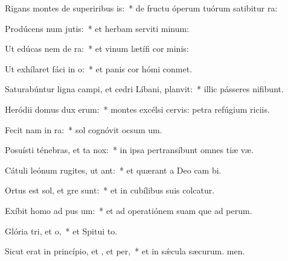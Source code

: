 \item Rigans montes de superiribus is:~* de fructu óperum tuórum satibitur ra:
\item Prodúcens num jutis:~* et herbam serviti minum:
\item Ut edúcas nem de ra:~* et vinum lætífi cor minis:
\item Ut exhílaret fáci in o:~* et panis cor hómi conmet.
\item Saturabúntur ligna campi, et cedri Líbani,  planvit:~* illic pásseres nifibunt.
\item Heródii domus dux  erum:~* montes excélsi cervis: petra refúgium riciis.
\item Fecit nam in ra:~* sol cognóvit ocsum um.
\item Posuísti ténebras, et ta  nox:~* in ipsa pertransíbunt omnes tiæ væ.
\item Cátuli leónum rugites, ut ant:~* et quærant a Deo cam bi.
\item Ortus est sol, et gre sunt:~* et in cubílibus suis colcatur.
\item Exíbit homo ad pus um:~* et ad operatiónem suam que ad perum.
\item Glória tri, et o,~* et Spitui to.
\item Sicut erat in princípio, et , et per,~* et in sǽcula sæcurum. men.
